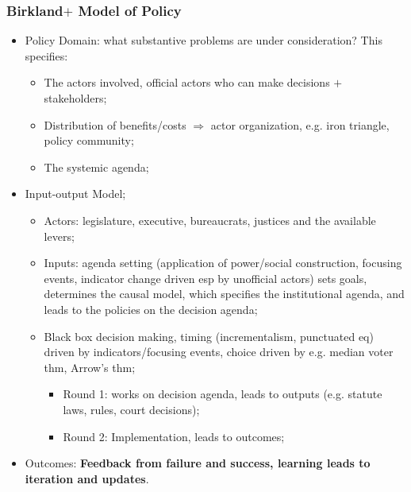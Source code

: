 \documentclass[aspectratio=169]{beamer}
\theoremstyle{principle}
\begin{document}
\begin{frame}
\frametitle{Birkland$+$ Model of Policy}
\begin{itemize}
\item Policy Domain: what substantive problems are under consideration?  This specifies:
\begin{itemize}
\item The actors involved, official actors who can make decisions $+$ stakeholders; 
\item Distribution of benefits/costs $\Rightarrow$ actor organization, e.g. iron triangle, policy community;
\item The systemic agenda; 
\end{itemize}
\bigskip
\item \color{black}Input-output Model;
\begin{itemize}
\item Actors: legislature, executive, bureaucrats, justices and the available levers;
\item Inputs: agenda setting (application of power/social construction, focusing events, indicator change driven esp by unofficial actors) sets goals, determines the causal model, which specifies the institutional agenda, and leads to the policies on the decision agenda;
\item Black box decision making, timing (incrementalism, punctuated eq) driven by indicators/focusing events, choice driven by e.g. median voter thm, Arrow's thm;
\begin{itemize}
\item Round 1: works on decision agenda, leads to outputs (e.g. statute laws, rules, court decisions);
\item Round 2: Implementation, leads to outcomes;
 \end{itemize}
\end{itemize}
\bigskip
\item Outcomes: \textbf{Feedback from failure and success, learning leads to iteration and updates}.
\end{itemize}
\end{frame}
\end{document}

